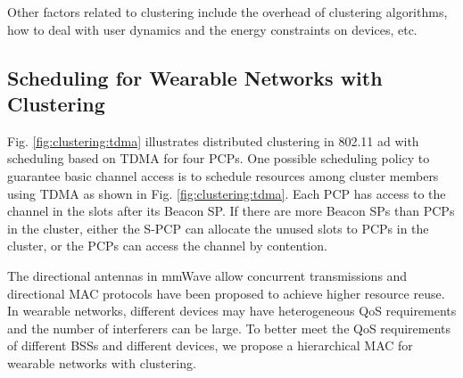 \documentclass[10pt, conference, letterpaper]{IEEEtran}
\begin{document}
Other factors related to clustering include the overhead of clustering algorithms, how to deal with user dynamics and the energy constraints on devices, etc.


\subsection{Scheduling for Wearable Networks with Clustering}\label{section:MAC:scheduling}

Fig. \ref{fig:clustering:tdma} illustrates distributed clustering in 802.11 ad with scheduling based on TDMA for four PCPs. 
One possible scheduling policy to guarantee basic channel access is to schedule resources among cluster members using TDMA as shown in Fig.  \ref{fig:clustering:tdma}. 
Each PCP has access to the channel in the slots after its Beacon SP. 
If there are more Beacon SPs than PCPs in the cluster, either the S-PCP can allocate the unused slots to PCPs in the cluster, or the PCPs can access the channel by contention.


The directional antennas in mmWave allow concurrent transmissions and directional MAC protocols \cite{virtualtimeslot}\cite{cocurrentbf} have been proposed to achieve higher resource reuse. 
In wearable networks, different devices may have heterogeneous QoS requirements and the number of interferers can be large.
To better meet the QoS requirements of different BSSs and different devices, we propose a hierarchical MAC for wearable networks with clustering.

\end{document}
